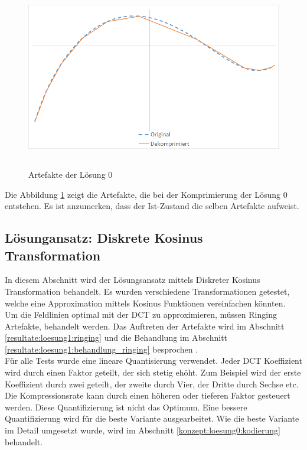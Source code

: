 \begin{figure}[!htbp]
	\center
	\includegraphics[width=1\textwidth,height=8cm,keepaspectratio]{./pictures/resultate/loesung0/loesung0_artefakte.png}
	\caption{Artefakte der Lösung 0}
	\label{resultate:loesung0:artefakte}
\end{figure}
Die Abbildung \ref{resultate:loesung0:artefakte} zeigt die Artefakte, die bei der Komprimierung der Lösung 0 entstehen. Es ist anzumerken, dass der Ist-Zustand die selben Artefakte aufweist.
\pagebreak

\subsection{Lösungansatz: Diskrete Kosinus Transformation}
In diesem Abschnitt wird der Lösungsansatz mittels Diskreter Kosinus Transformation behandelt. Es wurden verschiedene Transformationen getestet, welche eine Approximation mittels Kosinus Funktionen vereinfachen könnten.\\
Um die Feldlinien optimal mit der DCT zu approximieren, müssen Ringing Artefakte, behandelt werden. Das Auftreten der Artefakte wird im Abschnitt \ref{resultate:loesung1:ringing} und die Behandlung im Abschnitt \ref{resultate:loesung1:behandlung_ringing} besprochen .\\
[\baselineskip]
Für alle Tests wurde eine lineare Quantisierung verwendet. Jeder DCT Koeffizient wird durch einen Faktor geteilt, der sich stetig ehöht. Zum Beispiel wird der erste Koeffizient durch zwei geteilt, der zweite durch Vier, der Dritte durch Sechse etc.  Die Kompressionsrate kann durch einen höheren oder tieferen Faktor gesteuert werden. Diese Quantifizierung ist nicht das Optimum. Eine bessere Quantifizierung wird für die beste Variante ausgearbeitet. Wie die beste Variante im Detail umgesetzt wurde, wird im Abschnitt \ref{konzept:loesung0:kodierung} behandelt. 

